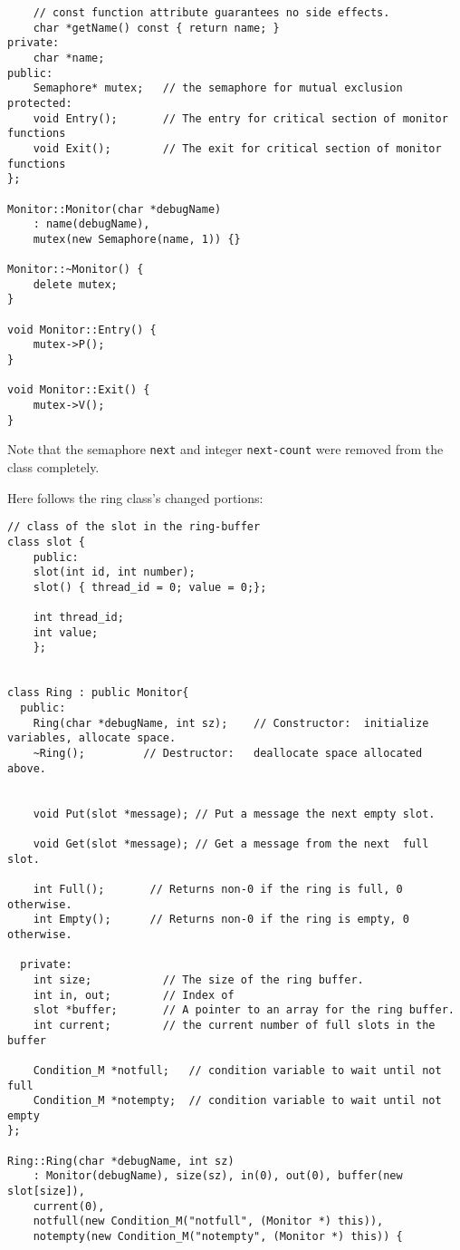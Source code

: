 \documentclass[11pt]{article}
\begin{document}
\begin{question}
\begin{verbatim}
    // const function attribute guarantees no side effects.
    char *getName() const { return name; }
private:
    char *name;
public:
    Semaphore* mutex;   // the semaphore for mutual exclusion
protected:
    void Entry();       // The entry for critical section of monitor functions
    void Exit();        // The exit for critical section of monitor functions
};

Monitor::Monitor(char *debugName)
    : name(debugName),
    mutex(new Semaphore(name, 1)) {}

Monitor::~Monitor() {
    delete mutex;
}

void Monitor::Entry() {
    mutex->P();
}

void Monitor::Exit() {
    mutex->V();
}
    \end{verbatim}

    Note that the semaphore {\tt next} and integer {\tt next-count} were removed from the class completely.

    Here follows the ring class's changed portions:

    \begin{verbatim}
// class of the slot in the ring-buffer
class slot {
    public:
    slot(int id, int number);
    slot() { thread_id = 0; value = 0;};

    int thread_id;
    int value;
    };


class Ring : public Monitor{
  public:
    Ring(char *debugName, int sz);    // Constructor:  initialize variables, allocate space.
    ~Ring();         // Destructor:   deallocate space allocated above.


    void Put(slot *message); // Put a message the next empty slot.

    void Get(slot *message); // Get a message from the next  full slot.

    int Full();       // Returns non-0 if the ring is full, 0 otherwise.
    int Empty();      // Returns non-0 if the ring is empty, 0 otherwise.

  private:
    int size;           // The size of the ring buffer.
    int in, out;        // Index of
    slot *buffer;       // A pointer to an array for the ring buffer.
    int current;        // the current number of full slots in the buffer

    Condition_M *notfull;   // condition variable to wait until not full
    Condition_M *notempty;  // condition variable to wait until not empty
};

Ring::Ring(char *debugName, int sz)
    : Monitor(debugName), size(sz), in(0), out(0), buffer(new slot[size]),
    current(0),
    notfull(new Condition_M("notfull", (Monitor *) this)),
    notempty(new Condition_M("notempty", (Monitor *) this)) {


\end{verbatim}
\end{question}
\end{document}
